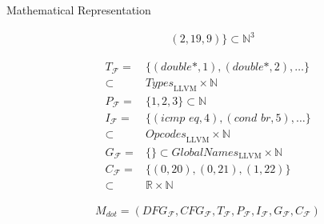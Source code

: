 \begin{blackbox}{Mathematical Representation}
\begin{minipage}{0.329\textwidth}
\begin{graybox}
\begin{align*}
                  &(2,19,9)\}\subset\mathbb N^3
            \end{align*}
        \end{graybox}
    \end{minipage}
    \begin{minipage}{0.329\textwidth}
        \centering
        \begin{graybox}
            \scriptsize
            \setlength{\abovedisplayskip}{0pt}
            \setlength{\belowdisplayskip}{0pt}
            \vspace{-0.5em}
            \begin{align*}
                T_\mathcal F={}&\{(\textit{double*},1),(\textit{double*},2),\dots\}\\[-0.5em]
                      \subset{}&\textit{Types}_\text{LLVM}\times\mathbb N\\[-0.25em]
                P_\mathcal F={}&\{1,2,3\}\subset\mathbb N\\[-0.25em]
                I_\mathcal F={}&\{(\textit{icmp eq},4),(\textit{cond br},5),\dots\}\\[-0.5em]
                      \subset{}&\textit{Opcodes}_\text{LLVM}\times\mathbb N\\[-0.25em]
                G_\mathcal F={}&\{\}\subset\textit{GlobalNames}_\text{LLVM}\times\mathbb N\\[-0.25em]
                C_\mathcal F={}&\{(0,20),(0,21),(1,22)\}\\[-0.5em]
                      \subset{}&\mathbb R\times\mathbb N
            \end{align*}

            \vspace{0.45em}
        \end{graybox}
    \end{minipage}

    \begin{minipage}{0.55\textwidth}
        \begin{graybox}
            \setlength{\abovedisplayskip}{0pt}
            \setlength{\belowdisplayskip}{0pt}
            \vspace{-0.5em}
            \begin{align*}
                M_{dot}=(DFG_\mathcal{F},
                 CFG_\mathcal{F},
                 T_\mathcal{F},
                 P_\mathcal{F},
                 I_\mathcal{F},
                 G_\mathcal{F},
                 C_\mathcal{F})
            \end{align*}
        \end{graybox}
    \end{minipage}
\end{blackbox}